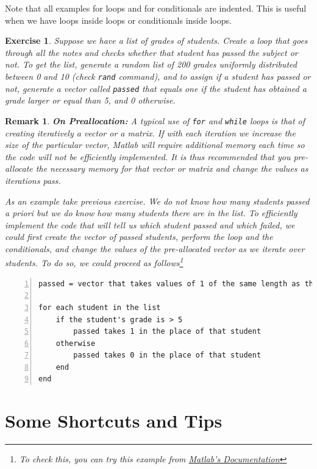 \documentclass[a4paper,11pt]{article}
\newtheorem{exercise}{Exercise}
\newtheorem{remark}{Remark}
\begin{document}
Note that all examples for loops and for conditionals are indented. This is useful when we have loops inside loops or conditionals inside loops.

\begin{exercise}
Suppose we have a list of grades of students. Create a loop that goes through all the notes and checks whether that student has passed the subject or not. To get the list, generate a random list of 200 grades uniformly distributed between 0 and 10 (check \verb;rand; command), and to assign if a student has passed or not, generate a vector called \verb;passed; that equals one if the student has obtained a grade larger or equal than 5, and 0 otherwise.
\end{exercise}

\begin{remark} 

\textbf{On Preallocation:} A typical use of \verb;for; and \verb;while; loops is that of creating iteratively a vector or a matrix. If with each iteration we increase the size of the particular vector, Matlab will require additional memory each time so the code will not be efficiently implemented. It is thus recommended that you \textit{pre-allocate} the necessary memory for that vector or matrix and change the values as iterations pass. 

As an example take previous exercise. We do not know how many students passed \textit{a priori} but we do know how many students there are in the list. To efficiently implement the code that will tell us which student passed and which failed, we could first create the vector of passed students, perform the loop and the conditionals, and change the values of the pre-allocated vector as we iterate over students. To do so, we could proceed as follows\footnote{To check this, you can try this example from \href{https://es.mathworks.com/help/matlab/matlab_prog/preallocating-arrays.html}{{Matlab's Documentation}}}
\end{remark}

\begin{Verbatim}[numbers=left]
passed = vector that takes values of 1 of the same length as the students' list.

for each student in the list
	if the student's grade is > 5
		passed takes 1 in the place of that student
	otherwise
		passed takes 0 in the place of that student
	end
end		
\end{Verbatim}

\section{Some Shortcuts and Tips}
\end{document}
